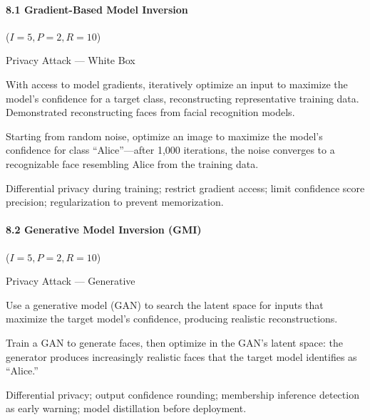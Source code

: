 \documentclass[conference]{IEEEtran}
\newenvironment{attackentry}{\begin{description}[style=unboxed,leftmargin=0cm,itemsep=1pt,parsep=1pt,topsep=2pt,font=\sffamily\small\color{accentdark}]}{\end{description}}
\begin{document}
\paragraph{8.1 Gradient-Based Model Inversion} ($I{=}5, P{=}2, R{=}10$)
\begin{attackentry}
\item[Category:] Privacy Attack --- White Box
\item[How it works:] With access to model gradients, iteratively optimize an input to maximize the model's confidence for a target class, reconstructing representative training data. Demonstrated reconstructing faces from facial recognition models.
\item[Example:] Starting from random noise, optimize an image to maximize the model's confidence for class ``Alice''---after 1,000 iterations, the noise converges to a recognizable face resembling Alice from the training data.
\item[Mitigations:] Differential privacy during training; restrict gradient access; limit confidence score precision; regularization to prevent memorization.
\end{attackentry}

\paragraph{8.2 Generative Model Inversion (GMI)} ($I{=}5, P{=}2, R{=}10$)
\begin{attackentry}
\item[Category:] Privacy Attack --- Generative
\item[How it works:] Use a generative model (GAN) to search the latent space for inputs that maximize the target model's confidence, producing realistic reconstructions.
\item[Example:] Train a GAN to generate faces, then optimize in the GAN's latent space: the generator produces increasingly realistic faces that the target model identifies as ``Alice.''
\item[Mitigations:] Differential privacy; output confidence rounding; membership inference detection as early warning; model distillation before deployment.
\end{attackentry}
\end{document}
